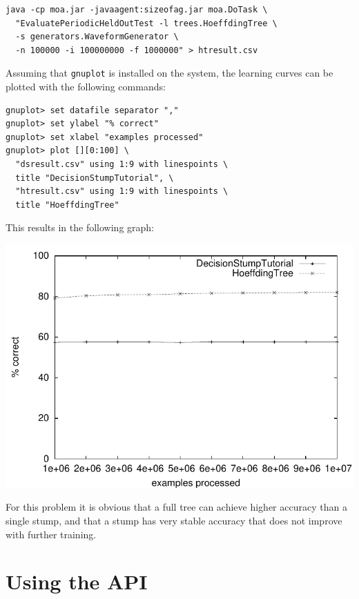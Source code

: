 \documentclass[a4paper,12pt,twoside]{book}
\begin{document}
\begin{footnotesize}\begin{verbatim}
java -cp moa.jar -javaagent:sizeofag.jar moa.DoTask \
  "EvaluatePeriodicHeldOutTest -l trees.HoeffdingTree \
  -s generators.WaveformGenerator \
  -n 100000 -i 100000000 -f 1000000" > htresult.csv
\end{verbatim}\end{footnotesize}

Assuming that \verb+gnuplot+ is installed on the system, the learning curves can be plotted with the following commands:

\begin{footnotesize}\begin{verbatim}
gnuplot> set datafile separator ","
gnuplot> set ylabel "% correct"
gnuplot> set xlabel "examples processed"
gnuplot> plot [][0:100] \
  "dsresult.csv" using 1:9 with linespoints \
  title "DecisionStumpTutorial", \
  "htresult.csv" using 1:9 with linespoints \
  title "HoeffdingTree"
\end{verbatim}\end{footnotesize}

This results in the following graph:

\includegraphics{figures/gnuplotGraph}

For this problem it is obvious that a full tree can achieve higher accuracy than a single stump, and that a stump has very stable accuracy that does not improve with further training.



\chapter{Using the API} %
\end{document}
